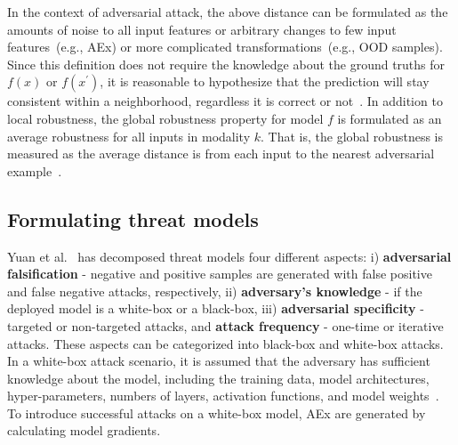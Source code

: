 \hspace*{3.5mm} In the context of adversarial attack, the above distance can be formulated as the amounts of noise to all input features or arbitrary changes to few input features~(e.g., AEx) or more complicated transformations~(e.g., OOD samples). 
Since this definition does not require the knowledge about the ground truths for $f(x)$ or $f\left(x^{\prime}\right)$, it is reasonable to hypothesize that the prediction will stay consistent  within a neighborhood, regardless it is correct or not~\cite{RobustnessNotEnough}.
In addition to local robustness, the global robustness property for model $f$ is formulated as an average robustness for all inputs in modality $k$. That is, the global robustness is measured as the average distance is from each input to the nearest adversarial example~\cite{RobustnessNotEnough}. 

\subsection{Formulating threat models}
Yuan et al.~\cite{yuan2019adversarial} has decomposed threat models four different aspects: 
i) \textbf{adversarial falsification} - negative and positive samples are generated with false positive and false negative attacks, respectively, ii) \textbf{adversary's knowledge} - if the deployed model is a white-box or a black-box, iii) \textbf{adversarial specificity} - targeted or non-targeted attacks, and  \textbf{attack frequency} - one-time or iterative attacks. These aspects can be categorized into black-box and white-box attacks. In a white-box attack scenario, it is assumed that the adversary has sufficient knowledge about the model, including the training data, model architectures, hyper-parameters, numbers of layers, activation functions, and model weights~\cite{yuan2019adversarial}. To introduce successful attacks on a white-box model, AEx are generated by calculating model gradients. 

